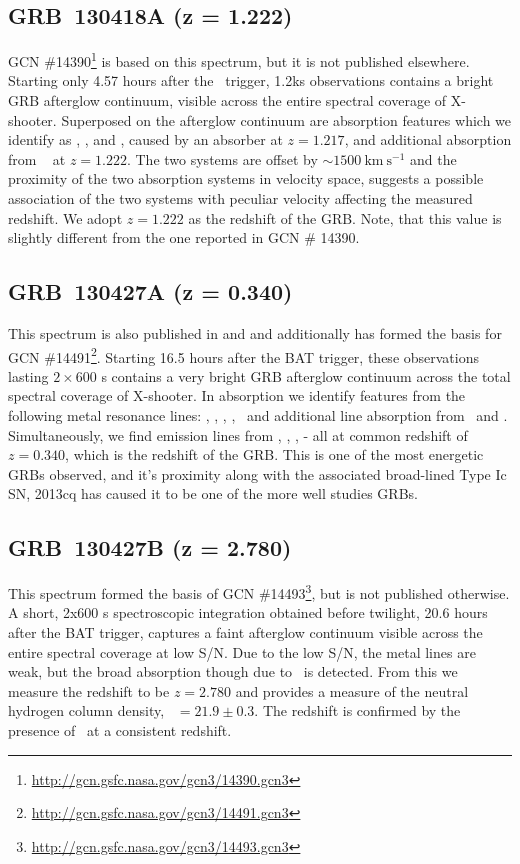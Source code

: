 \documentclass{aa}    %
\begin{document}
\subsection{GRB~130418A (z = 1.222)}

GCN \#14390\footnote{\url{http://gcn.gsfc.nasa.gov/gcn3/14390.gcn3}} is based on
this spectrum, but it is not published elsewhere. Starting only 4.57 hours after
the \swift~trigger, 1.2ks observations contains a bright GRB afterglow
continuum, visible across the entire spectral coverage of X-shooter. Superposed
on the afterglow continuum are absorption features which we identify as \civ,
\feii, and \mgii, caused by an absorber at $z = 1.217$, and additional
absorption from \civ~ at $z = 1.222$. The two systems are offset by $\sim
1500~\mathrm{km}~\mathrm{s}^{-1}$ and the proximity of the two absorption
systems in velocity space, suggests a possible association of the two systems
with peculiar velocity affecting the measured redshift. We adopt $z = 1.222$ as
the redshift of the GRB. Note, that this value is slightly different from the
one reported in GCN \# 14390.

\subsection{GRB~130427A (z = 0.340)}

This spectrum is also published in \citet{Xu2013b} and \citet{Kruhler2015} and
additionally has formed the basis for GCN
\#14491\footnote{\url{http://gcn.gsfc.nasa.gov/gcn3/14491.gcn3}}. Starting 16.5
hours after the BAT trigger, these observations lasting $2 \times 600$ s
contains a very bright GRB afterglow continuum across the total spectral
coverage of X-shooter. In absorption we identify features from the following
metal resonance lines: \feii, \mnii, \mgii, \mgi, \TIii~and additional line
absorption from \caii~and \nai. Simultaneously, we find emission lines from \ha,
\hb, \oiii, \oii - all at common redshift of $z = 0.340$, which is the redshift
of the GRB. This is one of the most energetic GRBs observed, and it's proximity
along with the associated broad-lined Type Ic SN, 2013cq has caused it to be one
of the more well studies GRBs.

\subsection{GRB~130427B (z = 2.780)}

This spectrum formed the basis of GCN
\#14493\footnote{\url{http://gcn.gsfc.nasa.gov/gcn3/14493.gcn3}}, but is not
published otherwise. A short, 2x600 s spectroscopic integration obtained before
twilight, 20.6 hours after the BAT trigger, captures a faint afterglow continuum
visible across the entire spectral coverage at low S/N. Due to the low S/N, the
metal lines are weak, but the broad absorption though due to \lya~is detected.
From this we measure the redshift to be $z = 2.780$ and provides a measure of
the neutral hydrogen column density, \nh~$= 21.9 \pm 0.3$. The redshift is
confirmed by the presence of \feii~at a consistent redshift.
\end{document}
